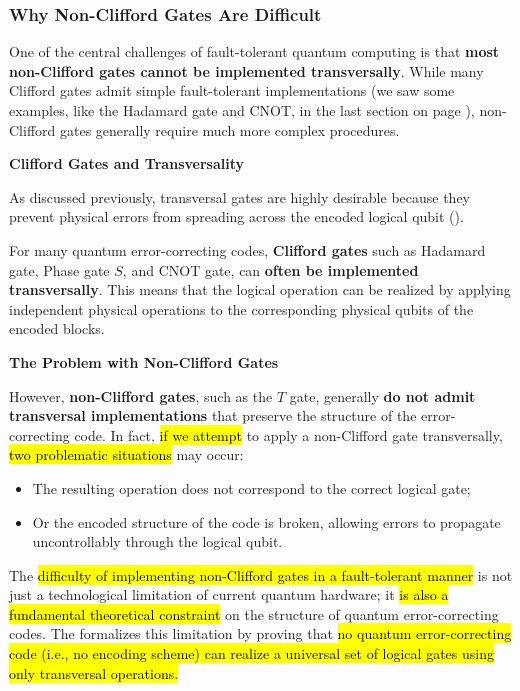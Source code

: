 \subsubsection{Why Non-Clifford Gates Are Difficult}\label{sec:why-non-clifford-gates-are-difficult}

One of the central challenges of fault-tolerant quantum computing is that \textbf{most non-Clifford gates cannot be implemented transversally}. While many Clifford gates admit simple fault-tolerant implementations (we saw some examples, like the Hadamard gate and CNOT, in the last section on page ), non-Clifford gates generally require much more complex procedures.

\highspace
\begin{flushleft}
    \textcolor{Green3}{ \textbf{Clifford Gates and Transversality}}
\end{flushleft}
As discussed previously, transversal gates are highly desirable because they prevent physical errors from spreading across the encoded logical qubit ().

\highspace
For many quantum error-correcting codes, \textbf{Clifford gates} such as Hadamard gate, Phase gate $S$, and CNOT gate, can \textbf{often be implemented transversally}. This means that the logical operation can be realized by applying independent physical operations to the corresponding physical qubits of the encoded blocks.

\highspace
\begin{flushleft}
    \textcolor{Red2}{ \textbf{The Problem with Non-Clifford Gates}}
\end{flushleft}
However, \textbf{non-Clifford gates}, such as the $T$ gate, generally \textbf{do not admit transversal implementations} that preserve the structure of the error-correcting code. In fact, \hl{if we attempt} to apply a non-Clifford gate transversally, \hl{two problematic situations} may occur:
\begin{itemize}
    \item[\textcolor{Red2}{\faIcon{times}}] The resulting operation does not correspond to the correct logical gate;
    \item[\textcolor{Red2}{\faIcon{times}}] Or the encoded structure of the code is broken, allowing errors to propagate uncontrollably through the logical qubit.
\end{itemize}
The \hl{difficulty of implementing non-Clifford gates in a fault-tolerant manner} is not just a technological limitation of current quantum hardware; it \hl{is also a fundamental theoretical constraint} on the structure of quantum error-correcting codes. The  formalizes this limitation by proving that \hl{no quantum error-correcting code (i.e., no encoding scheme) can realize a universal set of logical gates using only transversal operations.}

